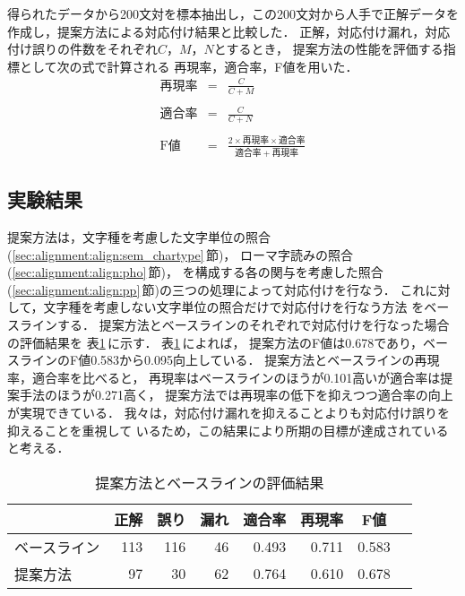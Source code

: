 得られたデータから200文対を標本抽出し，この200文対から人手で正解データを
作成し，提案方法による対応付け結果と比較した．
正解，対応付け漏れ，対応付け誤りの件数をそれぞれ$C$，$M$，$N$とするとき，
提案方法の性能を評価する指標として次の式で計算される
再現率，適合率，F値を用いた．
\begin{eqnarray*}
再現率 &=& \frac{C}{C+M} \\\\
適合率 &=& \frac{C}{C+N} \\\\
\mbox{F}値 &=& \frac{2 \times 再現率 \times 適合率}{適合率 + 再現率} 
\end{eqnarray*}


\subsection{実験結果}
\label{sec:experiment:result}

提案方法は，文字種を考慮した文字単位の照合
(\ref{sec:alignment:align:sem_chartype}\,節)，
ローマ字読みの照合(\ref{sec:alignment:align:pho}\,節)，
{\MTNP}を構成する各{\N}の関与を考慮した照合
(\ref{sec:alignment:align:pp}\,節)の三つの処理によって対応付けを行なう． 
これに対して，文字種を考慮しない文字単位の照合だけで対応付けを行なう方法
をベースラインする．
提案方法とベースラインのそれぞれで対応付けを行なった場合の評価結果を
表\ref{tab:result}\,に示す．
表\ref{tab:result}\,によれば，
提案方法のF値は0.678であり，ベースラインのF値0.583から0.095向上している．
提案方法とベースラインの再現率，適合率を比べると，
再現率はベースラインのほうが0.101高いが適合率は提案手法のほうが0.271高く，
提案方法では再現率の低下を抑えつつ適合率の向上が実現できている．
我々は，対応付け漏れを抑えることよりも対応付け誤りを抑えることを重視して
いるため，この結果により所期の目標が達成されていると考える．
\begin{table}[htbp]
\caption{提案方法とベースラインの評価結果}
\label{tab:result}
\begin{center}
\begin{tabular}{|l||r|r|r|r|r|r|r|}\hline
 & \multicolumn{1}{c|}{正解} & \multicolumn{1}{c|}{誤り} &  
\multicolumn{1}{c|}{漏れ} & \multicolumn{1}{c|}{適合率} & 
\multicolumn{1}{c|}{再現率} & \multicolumn{1}{c|}{F値} \\\hline\hline
ベースライン & 113 & 116 & 46 & 0.493 & 0.711 & 0.583 \\
提案方法     &  97 &  30 & 62 & 0.764 & 0.610 & 0.678 \\\hline
\end{tabular}
\end{center}
\end{table}

